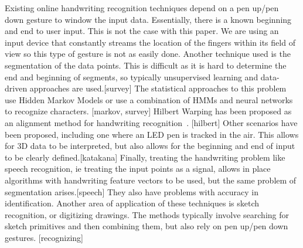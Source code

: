 Existing online handwriting recognition techniques depend on a pen up/pen down gesture to window the input data. Essentially, there is a known beginning and end to user input. This is not the case with this paper. We are using an input device that constantly streams the location of the fingers within its field of view so this type of gesture is not as easily done. Another technique used is the segmentation of the data points. This is difficult as it is hard to determine the end and beginning of segments, so typically unsupervised learning and data-driven approaches are used.[survey] The statistical approaches to this problem use Hidden Markov Models or use a combination of HMMs and neural networks to recognize characters. [markov, survey] Hilbert Warping has been proposed as an alignment method for handwriting recognition~\cite{ishida2010hilbert}. [hilbert] Other scenarios have been proposed, including one where an LED pen is tracked in the air. This allows for 3D data to be interpreted, but also allows for the beginning and end of input to be clearly defined.[katakana] Finally, treating the handwriting problem like speech recognition, ie treating the input points as a signal, allows in place algorithms with handwriting feature vectors to be used, but the same problem of segmentation arises.[speech] They also have problems with accuracy in identification. 
Another area of application of these techniques is sketch recognition, or digitizing drawings. The methods typically involve searching for sketch primitives and then combining them, but also rely on pen up/pen down gestures. [recognizing]
